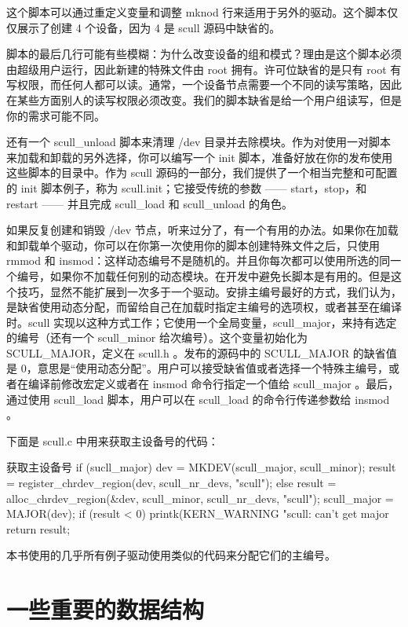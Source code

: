 \documentclass[lang=cn,newtx,10pt,scheme=chinese]{elegantbook}
\begin{document}
这个脚本可以通过重定义变量和调整 mknod 行来适用于另外的驱动。这个脚本仅仅展示了创建 4 个设备，因为 4 是 scull 源码中缺省的。

脚本的最后几行可能有些模糊：为什么改变设备的组和模式？理由是这个脚本必须由超级用户运行，因此新建的特殊文件由 root 拥有。许可位缺省的是只有 root 有写权限，而任何人都可以读。通常，一个设备节点需要一个不同的读写策略，因此在某些方面别人的读写权限必须改变。我们的脚本缺省是给一个用户组读写，但是你的需求可能不同。

还有一个 scull\_unload 脚本来清理 /dev 目录并去除模块。作为对使用一对脚本来加载和卸载的另外选择，你可以编写一个 init 脚本，准备好放在你的发布使用这些脚本的目录中。作为 scull 源码的一部分，我们提供了一个相当完整和可配置的 init 脚本例子，称为 scull.init；它接受传统的参数 —— start，stop，和 restart —— 并且完成 scull\_load 和 scull\_unload
的角色。

如果反复创建和销毁 /dev 节点，听来过分了，有一个有用的办法。如果你在加载和卸载单个驱动，你可以在你第一次使用你的脚本创建特殊文件之后，只使用 rmmod 和 insmod：这样动态编号不是随机的。并且你每次都可以使用所选的同一个编号，如果你不加载任何别的动态模块。在开发中避免长脚本是有用的。但是这个技巧，显然不能扩展到一次多于一个驱动。安排主编号最好的方式，我们认为，是缺省使用动态分配，而留给自己在加载时指定主编号的选项权，或者甚至在编译时。scull 实现以这种方式工作；它使用一个全局变量，scull\_major，来持有选定的编号（还有一个 scull\_minor 给次编号）。这个变量初始化为 SCULL\_MAJOR，定义在 scull.h 。发布的源码中的 SCULL\_MAJOR 的缺省值是 0，意思是``使用动态分配''。用户可以接受缺省值或者选择一个特殊主编号，或者在编译前修改宏定义或者在 insmod 命令行指定一个值给 scull\_major 。最后，通过使用 scull\_load 脚本，用户可以在 scull\_load 的命令行传递参数给 insmod 。

下面是 scull.c 中用来获取主设备号的代码：

\begin{mycode}{获取主设备号}
if (sucll_major) {
    dev = MKDEV(scull_major, scull_minor);
    result = register_chrdev_region(dev, scull_nr_devs, "scull");
} else {
    result = alloc_chrdev_region(&dev, scull_minor, scull_nr_devs, "scull");
    scull_major = MAJOR(dev);
}
if (result < 0) {
    printk(KERN_WARNING "scull: can't get major %
    return result;
}
\end{mycode}

本书使用的几乎所有例子驱动使用类似的代码来分配它们的主编号。

\section{一些重要的数据结构}
\end{document}
